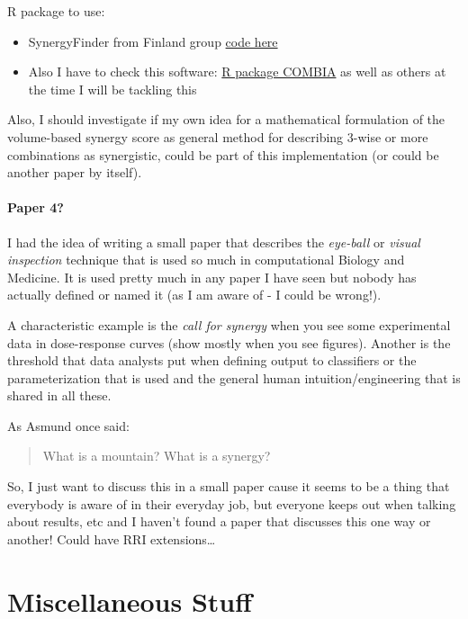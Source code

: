 \documentclass[12pt,]{book}
\providecommand{\tightlist}{%
  \setlength{\itemsep}{0pt}\setlength{\parskip}{0pt}}
\begin{document}
R package to use:

\begin{itemize}
\tightlist
\item
  SynergyFinder from Finland group \href{https://github.com/google/synergyfinderengineered/}{code here}
\item
  Also I have to check this software: \href{https://www.ncbi.nlm.nih.gov/pmc/articles/PMC5732778/}{R package COMBIA} as well as others
  at the time I will be tackling this
\end{itemize}

Also, I should investigate if my own idea for a mathematical
formulation of the volume-based synergy score as general method for describing 3-wise
or more combinations as synergistic, could be part of this implementation (or could be another paper by itself).

\hypertarget{paper-4}{%
\subsection{Paper 4?}\label{paper-4}}

I had the idea of writing a small paper that describes the \emph{eye-ball} or
\emph{visual inspection} technique that is used so much in computational Biology and
Medicine. It is used pretty much in any paper I have seen but nobody has actually
defined or named it (as I am aware of - I could be wrong!).

A characteristic example is the \emph{call for synergy} when you see some
experimental data in dose-response curves (show mostly when you see figures). Another is the threshold that data analysts put when defining output to classifiers or the parameterization that is used and the general human intuition/engineering that is shared in all these.

As Asmund once said:

\begin{quote}
What is a mountain? What is a synergy?
\end{quote}

So, I just want to discuss this in a small paper cause it seems to be a
thing that everybody is aware of in their everyday job, but everyone keeps out
when talking about results, etc and I haven't found a paper that discusses this
one way or another! Could have RRI extensions\ldots{}

\hypertarget{part-miscellaneous-stuff}{%
\part*{Miscellaneous Stuff}\label{part-miscellaneous-stuff}}
\end{document}
